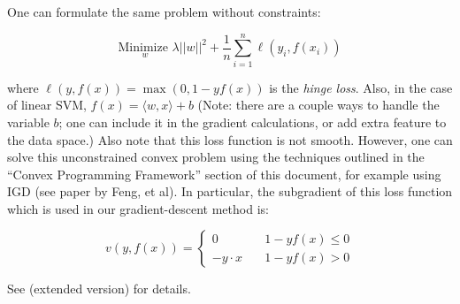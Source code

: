 One can formulate the same problem without constraints:

\begin{equation}
\underset{w}{\text{Minimize }} \lambda ||w||^2 + \frac{1}{n}\sum_{i=1}^n \ell(y_i,f(x_i))
\end{equation}


where $\ell(y,f(x)) = \max(0,1-yf(x))$ is the \textit{hinge loss}. Also, in the case of linear SVM, $f(x) = \langle w, x\rangle + b$ (Note: there are a couple ways to handle the variable $b$; one can include it in the gradient calculations, or add extra feature to the data space.) Also note that this loss function is not smooth. However, one can solve this unconstrained convex problem using the techniques outlined in the ``Convex Programming Framework'' section of this document, for example using IGD (see paper by Feng, et al). In particular, the subgradient of this loss function which is used in our gradient-descent method is:

$$
v(y,f(x)) = \left\{
        \begin{array}{ll}
            0 & \quad 1-yf(x) \leq 0 \\
            -y\cdot x & \quad  1-yf(x) > 0
        \end{array}
    \right.
$$

See \cite{ShSS07} (extended version) for details.



%
%
%


